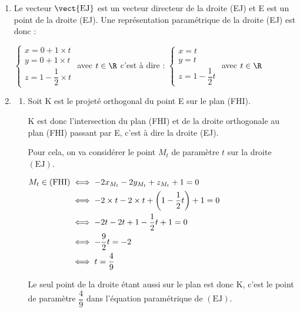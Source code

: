 \begin{enumerate}
Une équation cartésienne du plan (FHI)  est donc de la forme : \quad   $-2x-2y+z+d=0$ avec $d \in \R$.

De plus, le point F appartient au plan (FHI) donc ses coordonnées verifient l'équation du plan. On a donc :

$\aligned[t] \mathrm{F} \in (\mathrm{FHI}) &\iff -2\times x_\mathrm{F}  -2 \times y_\mathrm{F} + z_\mathrm{F} +d=0 \\
	&\iff -2\times 1  -2 \times 0 + 1 +d=0 \\
	&\iff -2+1+d=0 \\
	&\iff d=1\endaligned$

Une équation cartésienne du plan (FHI) est donc	$-2x-2y+ z+1=0$.
 \item Le vecteur $\vect{\text{EJ}} $ est un vecteur directeur de la droite (EJ) et E est un point de la droite (EJ).  Une représentation paramétrique de la droite (EJ) est donc :

$\begin{cases} x= 0 + 1\times t \\ y=0 + 1 \times t  \\ z=1 - \dfrac{1}{2} \times t  \end{cases} $ avec $t \in \R$ \quad c'est à dire \quad : $\begin{cases} x= t \\ y=t  \\ z=1 - \dfrac{1}{2} t  \end{cases} $ avec $t \in \R$

	\item
	\begin{enumerate}
		\item Soit K est le projeté orthogonal du point E sur le plan (FHI).

K est donc l'intersection du plan (FHI) et de la droite orthogonale au plan (FHI) passant par E, c'est à dire la droite (EJ).

Pour cela, on va considérer le point $M_t$ de paramètre $t$ sur la droite $(\mathrm{EJ})$.

$\aligned M_t \in (\mathrm{FHI}) &\iff -2x_{M_t} -2y_{M_t}+z_{M_t} +1 = 0\\
&\iff -2\times t -2  \times t  +  \left( 1- \dfrac{1}{2}t\right) +1=0 \\
&\iff -2t-2t+1-\dfrac{1}{2}t+1=0 \\
&\iff -\dfrac{9}{2}t = -2 \\
&\iff t= \dfrac{4}{9} \endaligned$

Le seul point de la droite étant aussi sur le plan est donc K, c'est le point de paramètre $\dfrac{4}{9}$ dans l'équation paramétrique de $(\mathrm{EJ})$.


\end{enumerate}
\end{enumerate}
